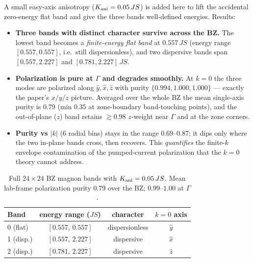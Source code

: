 \documentclass[11pt]{article}
\begin{document}
A small easy-axis anisotropy ($K_{\rm ani}=0.05\,JS$) is added here to lift
the accidental zero-energy flat band and give the three bands well-defined
energies. Results:
\begin{itemize}
\item \textbf{Three bands with distinct character survive across the BZ.}
The lowest band becomes a \emph{finite-energy flat band} at
$0.557\,JS$ (energy range $[0.557,0.557]$, i.e.\ still dispersionless), and
two dispersive bands span $[0.557,2.227]$ and $[0.781,2.227]\,JS$.
\item \textbf{Polarization is pure at $\Gamma$ and degrades smoothly.} At
$k=0$ the three modes are polarized along $\hat y,\hat x,\hat z$ with purity
$\{0.994,1.000,1.000\}$ --- exactly the paper's $x/y/z$ picture. Averaged
over the whole BZ the mean single-axis purity is $0.79$ (min $0.35$ at
zone-boundary band-touching points), and the out-of-plane ($z$) band retains
$\gtrsim0.98$ $z$-weight near $\Gamma$ and at the zone corners.
\item \textbf{Purity vs $|k|$} (6 radial bins) stays in the range
$0.69$--$0.87$; it dips only where the two in-plane bands cross, then
recovers. This \emph{quantifies} the finite-$k$ envelope contamination of
the pumped-current polarization that the $k=0$ theory cannot address.
\end{itemize}

\begin{table}[h]\centering
\begin{tabular}{lccc}
\toprule
Band & energy range ($JS$) & character & $k=0$ axis \\
\midrule
0 (flat)      & $[0.557,\,0.557]$ & dispersionless & $\hat y$ \\
1 (disp.)     & $[0.557,\,2.227]$ & dispersive     & $\hat x$ \\
2 (disp.)     & $[0.781,\,2.227]$ & dispersive     & $\hat z$ \\
\bottomrule
\end{tabular}
\caption{Full $24\times24$ BZ magnon bands with $K_{\rm ani}=0.05\,JS$. Mean
lab-frame polarization purity $0.79$ over the BZ; $0.99$--$1.00$ at $\Gamma$.}
\end{table}
\end{document}
